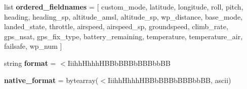 \begin{DoxyCompactItemize}
\mbox{\label{classpymavlink_1_1dialects_1_1v10_1_1MAVLink__high__latency__message_aa212ed254a31dc2a405f1c541c394629}} 
list {\bfseries ordered\+\_\+fieldnames} = \mbox{[} \textquotesingle{}custom\+\_\+mode\textquotesingle{}, \textquotesingle{}latitude\textquotesingle{}, \textquotesingle{}longitude\textquotesingle{}, \textquotesingle{}roll\textquotesingle{}, \textquotesingle{}pitch\textquotesingle{}, \textquotesingle{}heading\textquotesingle{}, \textquotesingle{}heading\+\_\+sp\textquotesingle{}, \textquotesingle{}altitude\+\_\+amsl\textquotesingle{}, \textquotesingle{}altitude\+\_\+sp\textquotesingle{}, \textquotesingle{}wp\+\_\+distance\textquotesingle{}, \textquotesingle{}base\+\_\+mode\textquotesingle{}, \textquotesingle{}landed\+\_\+state\textquotesingle{}, \textquotesingle{}throttle\textquotesingle{}, \textquotesingle{}airspeed\textquotesingle{}, \textquotesingle{}airspeed\+\_\+sp\textquotesingle{}, \textquotesingle{}groundspeed\textquotesingle{}, \textquotesingle{}climb\+\_\+rate\textquotesingle{}, \textquotesingle{}gps\+\_\+nsat\textquotesingle{}, \textquotesingle{}gps\+\_\+fix\+\_\+type\textquotesingle{}, \textquotesingle{}battery\+\_\+remaining\textquotesingle{}, \textquotesingle{}temperature\textquotesingle{}, \textquotesingle{}temperature\+\_\+air\textquotesingle{}, \textquotesingle{}failsafe\textquotesingle{}, \textquotesingle{}wp\+\_\+num\textquotesingle{} \mbox{]}
\item 
\mbox{\label{classpymavlink_1_1dialects_1_1v10_1_1MAVLink__high__latency__message_ae73007eb00a753d9023acd4734a553ef}} 
string {\bfseries format} = \textquotesingle{}$<$Iiihh\+Hhhh\+H\+B\+Bb\+B\+B\+Bb\+B\+B\+Bbb\+BB\textquotesingle{}
\item 
\mbox{\label{classpymavlink_1_1dialects_1_1v10_1_1MAVLink__high__latency__message_a38fa96d0daaf55b5f2ca86be2f439cbc}} 
{\bfseries native\+\_\+format} = bytearray(\textquotesingle{}$<$Iiihh\+Hhhh\+H\+B\+Bb\+B\+B\+Bb\+B\+B\+Bbb\+BB\textquotesingle{}, \textquotesingle{}ascii\textquotesingle{})
\item 
\mbox{\label{classpymavlink_1_1dialects_1_1v10_1_1MAVLink__high__latency__message_a57258d2d2c5584c8d3aaccd39c178de1}} 

\end{DoxyCompactItemize}
